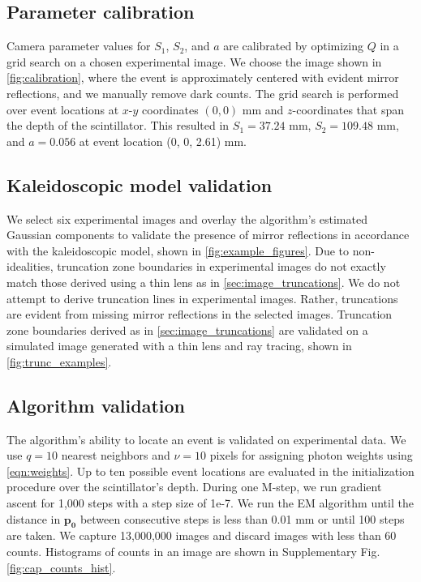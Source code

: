 \subsection{Parameter calibration}
Camera parameter values for $S_1$, $S_2$, and $a$ are calibrated by optimizing $Q$ 
in a grid search on a chosen experimental image.
We choose the image shown in \cref{fig:calibration}, where the event is 
approximately centered with evident mirror reflections, and we manually remove 
dark counts.
The grid search is performed over event locations at $x$-$y$ coordinates 
$(0,0)$ mm and $z$-coordinates that span the depth of the scintillator.
This resulted in $S_1=37.24$ mm, $S_2=109.48$ mm, and $a=0.056$ at event location 
(0, 0, 2.61) mm.


\subsection{Kaleidoscopic model validation}
We select six experimental images and overlay the algorithm's estimated Gaussian 
components to validate the presence of mirror reflections in accordance with the 
kaleidoscopic model, shown in \cref{fig:example_figures}.
Due to non-idealities, truncation zone boundaries in experimental images do not 
exactly match those derived using a thin lens as in \cref{sec:image_truncations}.
We do not attempt to derive truncation lines in experimental images.
Rather, truncations are evident from missing mirror reflections in the selected images.
Truncation zone boundaries derived as in \cref{sec:image_truncations} are 
validated on a simulated image generated with a thin lens and ray tracing, shown in \cref{fig:trunc_examples}.


\subsection{Algorithm validation}
The algorithm's ability to locate an event is validated on experimental data.
We use $q=10$ nearest neighbors and $\nu=10$ pixels for assigning photon weights 
using \cref{eqn:weights}.
Up to ten possible event locations are evaluated in the initialization procedure 
over the scintillator's depth.
During one M-step, we run gradient ascent for 1,000 steps with a step size of 1e-7.
We run the EM algorithm until the distance in $\bm{p_0}$ between consecutive steps 
is less than 0.01 mm or until 100 steps are taken.
We capture 13,000,000 images and discard images with less than 60 counts.
Histograms of counts in an image are shown in Supplementary Fig. \ref*{fig:cap_counts_hist}.

